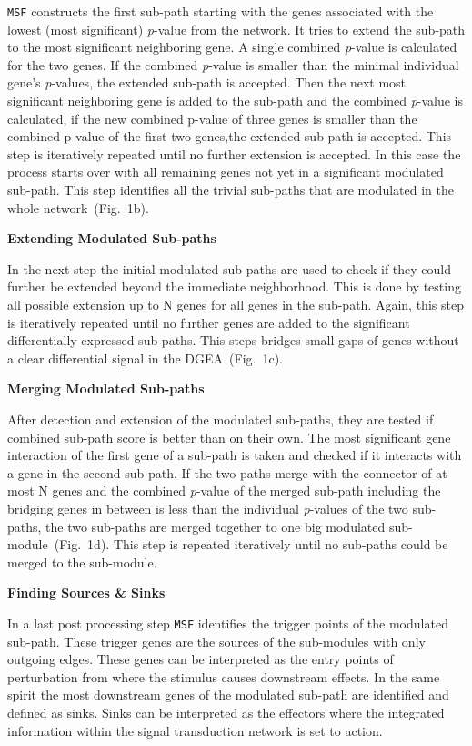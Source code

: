 \documentclass[twocolumn]{article}
\begin{document}
\texttt{MSF} constructs the first sub-path starting with the genes
associated with the lowest (most significant) \textit{p}-value from
the network. It tries to extend the
sub-path to the most significant neighboring gene. A single combined
\textit{p}-value is calculated for the two genes. If the combined
\textit{p}-value is smaller than the minimal individual gene's
\textit{p}-values, the extended sub-path is accepted. Then the next most significant neighboring gene is added to the sub-path and the combined \textit{p}-value is calculated, if the new combined p-value of three genes is smaller than the combined p-value of the first two genes,the extended sub-path is accepted. This step is iteratively repeated until no further extension is accepted. In this
case the process starts over with all remaining genes not yet in a
significant modulated sub-path. This step identifies all the trivial
sub-paths that are modulated in the whole network~(Fig.~1b).\newline

\textbf{Extending Modulated Sub-paths}

In the next step the initial modulated sub-paths are used to check if
they could further be extended beyond the immediate neighborhood.
This is done by testing all possible extension up to N genes for
all genes in the sub-path. Again, this step is iteratively repeated until no
further genes are added to the significant differentially expressed
sub-paths. This steps bridges small gaps of genes without a clear
differential signal in the DGEA~(Fig.~1c).\newline

\textbf{Merging Modulated Sub-paths}

After detection and extension of the modulated sub-paths, they are
tested if combined sub-path score is better than on their own. The most significant gene interaction of the first gene of a sub-path is taken and checked if it interacts with a gene in the second sub-path. If the two
paths merge with the connector of at most N genes and the
combined \textit{p}-value of the merged sub-path including the
bridging genes in between is less than the individual
\textit{p}-values of the two sub-paths, the two sub-paths are merged
together to one big modulated sub-module~(Fig.~1d). This step is repeated iteratively until no sub-paths could be merged to the sub-module.\newline
 
\textbf{Finding Sources \& Sinks}

In a last post processing step \texttt{MSF} identifies the trigger
points of the modulated sub-path. These trigger genes are the sources
of the sub-modules with only outgoing edges. These genes can be
interpreted as the entry points of perturbation from where the
stimulus causes downstream effects. In the same spirit the most
downstream genes of the modulated sub-path are identified and defined
as sinks. Sinks can be interpreted as the effectors where the
integrated information within the signal transduction network is set
to action.
\end{document}
